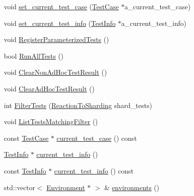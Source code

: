\begin{DoxyCompactItemize}
void \hyperlink{classtesting_1_1internal_1_1UnitTestImpl_a0566e56597ac7b24d29d6545d82b5f3e}{set\-\_\-current\-\_\-test\-\_\-case} (\hyperlink{classtesting_1_1TestCase}{\-Test\-Case} $\ast$a\-\_\-current\-\_\-test\-\_\-case)
\item 
void \hyperlink{classtesting_1_1internal_1_1UnitTestImpl_a8bfd2a1906902da5fa95a75792883177}{set\-\_\-current\-\_\-test\-\_\-info} (\hyperlink{classtesting_1_1TestInfo}{\-Test\-Info} $\ast$a\-\_\-current\-\_\-test\-\_\-info)
\item 
void \hyperlink{classtesting_1_1internal_1_1UnitTestImpl_a42dd6cc650b930bbf73f665fbb13d515}{\-Register\-Parameterized\-Tests} ()
\item 
bool \hyperlink{classtesting_1_1internal_1_1UnitTestImpl_a4d5d6a2e8fa3b918a284252602a98279}{\-Run\-All\-Tests} ()
\item 
void \hyperlink{classtesting_1_1internal_1_1UnitTestImpl_a3f7a43dd50595257ac958e7ec9112945}{\-Clear\-Non\-Ad\-Hoc\-Test\-Result} ()
\item 
void \hyperlink{classtesting_1_1internal_1_1UnitTestImpl_ab35604304840b940d31f5153986b7e19}{\-Clear\-Ad\-Hoc\-Test\-Result} ()
\item 
int \hyperlink{classtesting_1_1internal_1_1UnitTestImpl_af8cfcffb71cba69a55105ddac96786aa}{\-Filter\-Tests} (\hyperlink{classtesting_1_1internal_1_1UnitTestImpl_ac8d671a300e2bd293e21f8ad1612543c}{\-Reaction\-To\-Sharding} shard\-\_\-tests)
\item 
void \hyperlink{classtesting_1_1internal_1_1UnitTestImpl_abc77b71cd244096a75b13b8a2d9f7d14}{\-List\-Tests\-Matching\-Filter} ()
\item 
const \hyperlink{classtesting_1_1TestCase}{\-Test\-Case} $\ast$ \hyperlink{classtesting_1_1internal_1_1UnitTestImpl_af774518d9be68f728e9fffb00433ce69}{current\-\_\-test\-\_\-case} () const 
\item 
\hyperlink{classtesting_1_1TestInfo}{\-Test\-Info} $\ast$ \hyperlink{classtesting_1_1internal_1_1UnitTestImpl_aff1e50095f685628d566cb3ac72f902f}{current\-\_\-test\-\_\-info} ()
\item 
const \hyperlink{classtesting_1_1TestInfo}{\-Test\-Info} $\ast$ \hyperlink{classtesting_1_1internal_1_1UnitTestImpl_a7e73834280234683e770ad12dc7c5ecc}{current\-\_\-test\-\_\-info} () const 
\item 
std\-::vector$<$ \hyperlink{classtesting_1_1Environment}{\-Environment} $\ast$ $>$ \& \hyperlink{classtesting_1_1internal_1_1UnitTestImpl_ab8c736184a052dbb4cb9e217683bae7a}{environments} ()
\item 

\end{DoxyCompactItemize}
